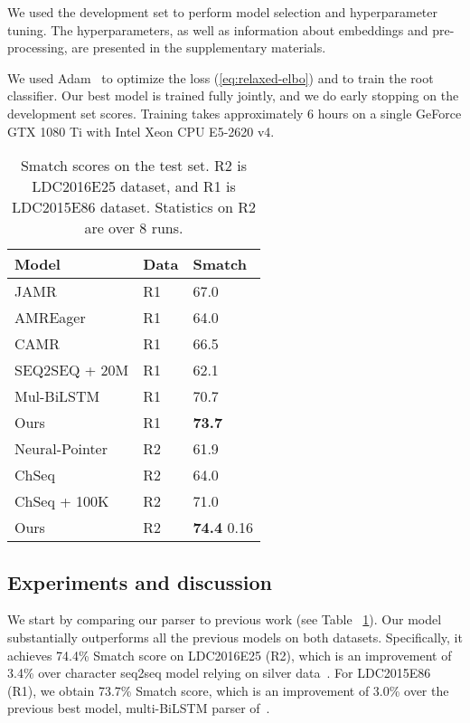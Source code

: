 \documentclass[11pt,a4paper]{article}
\begin{document}
 We used the development set to perform model selection and hyperparameter tuning. The hyperparameters, as well as  information about embeddings and pre-processing, are presented in the supplementary materials. 
 
We used Adam~\cite{Kingma2014AdamAM} to optimize the loss (\ref{eq:relaxed-elbo}) and to train the root classifier. 
Our best model is trained fully jointly, and
we do early stopping on the development set scores. Training takes approximately 6 hours on a single GeForce GTX 1080 Ti with Intel Xeon CPU E5-2620 v4.

\nocite{pytorch,nltk}
\begin{table}[t!]
    \begin{center} 
        \begin{tabular}{lll} 
            \hline  Model & Data & Smatch \\ \hline
            JAMR \tiny\cite{jamr-16} & R1& 67.0  \\
            AMREager \tiny\cite{Marco} & R1& 64.0  \\
            CAMR  \tiny\cite{camr_sem} & R1& 66.5  \\
            SEQ2SEQ + 20M  \tiny\cite{konstas-EtAl:2017:Long} & R1&  62.1\\
            Mul-BiLSTM \tiny\cite{foland-martin:2017:Long} & R1&  70.7\\
            Ours & R1&  \bf 73.7\\
            \hline
            Neural-Pointer \tiny\cite{neural-pointer-eval-16} & R2 & 61.9 \\
            ChSeq \tiny\cite{Character} & R2&   64.0\\
            ChSeq + 100K  \tiny\cite{Character} & R2&   71.0\\
            Ours & R2& {\bf74.4} \tiny  0.16\\
            \hline
        \end{tabular}
    \end{center}
    \caption{\label{table:all_results}Smatch scores on the test set. R2 is LDC2016E25 dataset, and R1 is LDC2015E86 dataset. Statistics on R2 are over 8 runs.}
\end{table}

\subsection{Experiments and discussion}

We start by comparing our parser to previous work (see Table ~\ref{table:all_results}). Our model substantially outperforms all the previous models on both datasets. Specifically, it achieves 74.4\%  Smatch score on LDC2016E25 (R2), which is an improvement of 3.4\% over character seq2seq model relying on silver data~\cite{Character}. For LDC2015E86 (R1), we obtain 73.7\% Smatch score, which is an improvement of 3.0\% over  the previous best model,  multi-BiLSTM parser of~.
\end{document}
